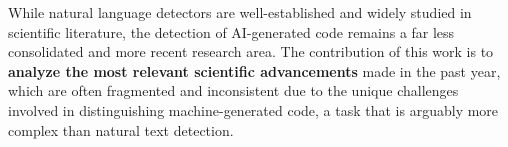 While natural language detectors are well-established and widely 
studied in scientific literature, the detection of AI-generated code 
remains a far less consolidated and more recent research area. 
The contribution of this work is to \textbf{analyze the most relevant 
scientific advancements} made in the past year, which are often fragmented and 
inconsistent due to the unique challenges involved in distinguishing 
machine-generated code, a task that is arguably more complex than natural 
text detection.







